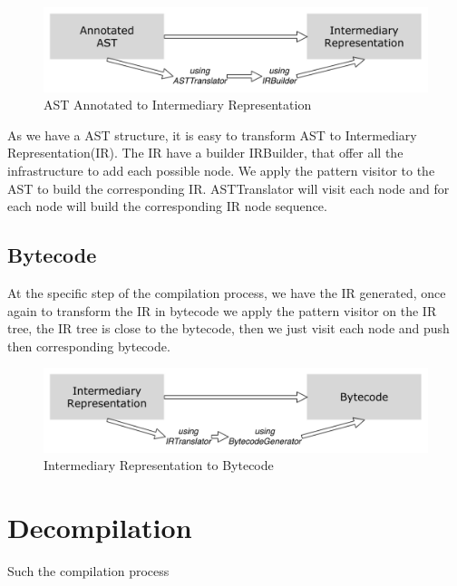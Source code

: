 \documentclass[a4paper,10pt,twoside]{book}
\begin{document}
\begin{figure}[ht]\centering
	\includegraphics[width=\linewidth]{AnnotatedASTToIR}
	\caption{AST Annotated to Intermediary Representation }
\end{figure}

As we have a AST structure, it is easy to transform AST to Intermediary Representation(IR). The IR have a builder IRBuilder, that offer all the infrastructure to add each possible node. We apply the pattern visitor to the AST to build the corresponding IR. ASTTranslator will visit each node and for each node will build the corresponding IR node sequence.


\subsection{Bytecode}
At the specific step of the compilation process, we have the IR generated, once again to transform the IR in bytecode we apply the pattern visitor on the IR tree, the IR tree is close to the bytecode, then we just visit each node and push then corresponding bytecode.

\begin{figure}[ht]\centering
	\includegraphics[width=\linewidth]{IRToBytecode}
	\caption{Intermediary Representation to Bytecode }
\end{figure}

\section{Decompilation}
Such the compilation process

\ifx\wholebook\relax\else
   
   
\end{document}
